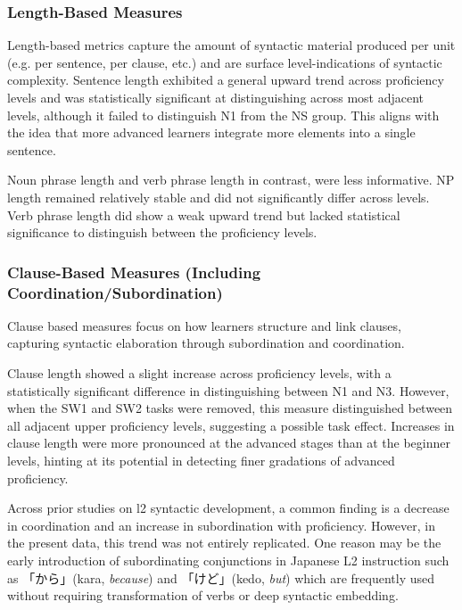 \subsubsection{Length-Based Measures}

Length-based metrics capture the amount of syntactic material produced per unit (e.g. per sentence, per clause,
etc.) and are surface level-indications of syntactic complexity. Sentence length exhibited a general upward trend
across proficiency levels and was statistically significant at distinguishing across most adjacent levels, although
it failed to distinguish N1 from the NS group. This aligns
with
the idea that more advanced learners integrate more elements into a single sentence.

Noun phrase length and verb phrase length in contrast, were less informative. NP length remained relatively stable
and did not significantly differ across levels. Verb phrase length did show a weak upward trend but lacked
statistical significance to distinguish between the proficiency levels.

\subsubsection{Clause-Based Measures (Including Coordination/Subordination)}
Clause based measures focus on how learners structure and link clauses, capturing syntactic elaboration through
subordination and coordination.

Clause length showed a slight
increase across proficiency levels, with a statistically significant difference in distinguishing between N1 and N3.
However, when the SW1 and SW2
tasks were removed, this measure distinguished between all adjacent upper proficiency levels, suggesting a
possible
task effect. Increases in clause length were more pronounced at the advanced stages than at the beginner levels,
hinting at its potential in detecting finer gradations of advanced proficiency.

Across prior studies on l2 syntactic development, a common finding is a decrease in coordination and an increase in
subordination with proficiency\citep{Vyatkina2012, Lu2010,Lu2011}. However, in the present data, this trend was not
entirely replicated. One reason may be the early introduction of subordinating conjunctions in Japanese L2
instruction such as 「から」(kara, \textit{because}) and 「けど」(kedo, \textit{but}) which are frequently used without
requiring transformation of verbs or deep syntactic embedding.

